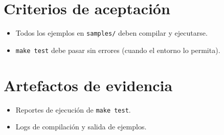 \documentclass[11pt,a4paper]{article}
\begin{document}
\section{Criterios de aceptación}
\begin{itemize}
    \item Todos los ejemplos en \texttt{samples/} deben compilar y ejecutarse.
    \item \texttt{make test} debe pasar sin errores (cuando el entorno lo permita).
\end{itemize}

\section{Artefactos de evidencia}
\begin{itemize}
    \item Reportes de ejecución de \texttt{make test}.
    \item Logs de compilación y salida de ejemplos.
\end{itemize}
\end{document}
